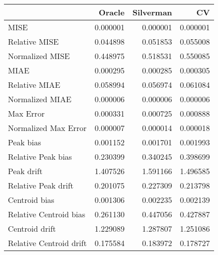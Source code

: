 \begin{tabular}{lrrr}
  \hline
 & Oracle & Silverman & CV \\ 
  \hline
MISE & 0.000001 & 0.000001 & 0.000001 \\ 
  Relative MISE & 0.044898 & 0.051853 & 0.055008 \\ 
  Normalized MISE & 0.448975 & 0.518531 & 0.550085 \\ 
  MIAE & 0.000295 & 0.000285 & 0.000305 \\ 
  Relative MIAE & 0.058994 & 0.056974 & 0.061084 \\ 
  Normalized MIAE & 0.000006 & 0.000006 & 0.000006 \\ 
  Max Error & 0.000331 & 0.000725 & 0.000888 \\ 
  Normalized Max Error & 0.000007 & 0.000014 & 0.000018 \\ 
  Peak bias & 0.001152 & 0.001701 & 0.001993 \\ 
  Relative Peak bias & 0.230399 & 0.340245 & 0.398699 \\ 
  Peak drift & 1.407526 & 1.591166 & 1.496585 \\ 
  Relative Peak drift & 0.201075 & 0.227309 & 0.213798 \\ 
  Centroid bias & 0.001306 & 0.002235 & 0.002139 \\ 
  Relative Centroid bias & 0.261130 & 0.447056 & 0.427887 \\ 
  Centroid drift & 1.229089 & 1.287807 & 1.251086 \\ 
  Relative Centroid drift & 0.175584 & 0.183972 & 0.178727 \\ 
   \hline
\end{tabular}
